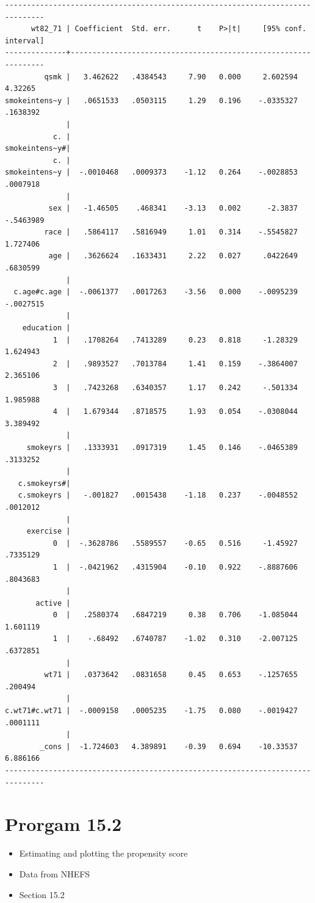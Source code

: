 \documentclass[
  10pt,
]{book}
\providecommand{\tightlist}{%
  \setlength{\itemsep}{0pt}\setlength{\parskip}{0pt}}
\begin{document}
\begin{verbatim}
-------------------------------------------------------------------------------
      wt82_71 | Coefficient  Std. err.      t    P>|t|     [95% conf. interval]
--------------+----------------------------------------------------------------
         qsmk |   3.462622   .4384543     7.90   0.000     2.602594     4.32265
smokeintens~y |   .0651533   .0503115     1.29   0.196    -.0335327    .1638392
              |
           c. |
smokeintens~y#|
           c. |
smokeintens~y |  -.0010468   .0009373    -1.12   0.264    -.0028853    .0007918
              |
          sex |   -1.46505    .468341    -3.13   0.002      -2.3837   -.5463989
         race |   .5864117   .5816949     1.01   0.314    -.5545827    1.727406
          age |   .3626624   .1633431     2.22   0.027     .0422649    .6830599
              |
  c.age#c.age |  -.0061377   .0017263    -3.56   0.000    -.0095239   -.0027515
              |
    education |
           1  |   .1708264   .7413289     0.23   0.818     -1.28329    1.624943
           2  |   .9893527   .7013784     1.41   0.159    -.3864007    2.365106
           3  |   .7423268   .6340357     1.17   0.242     -.501334    1.985988
           4  |   1.679344   .8718575     1.93   0.054    -.0308044    3.389492
              |
     smokeyrs |   .1333931   .0917319     1.45   0.146    -.0465389    .3133252
              |
   c.smokeyrs#|
   c.smokeyrs |   -.001827   .0015438    -1.18   0.237    -.0048552    .0012012
              |
     exercise |
           0  |  -.3628786   .5589557    -0.65   0.516     -1.45927    .7335129
           1  |  -.0421962   .4315904    -0.10   0.922    -.8887606    .8043683
              |
       active |
           0  |   .2580374   .6847219     0.38   0.706    -1.085044    1.601119
           1  |    -.68492   .6740787    -1.02   0.310    -2.007125    .6372851
              |
         wt71 |   .0373642   .0831658     0.45   0.653    -.1257655     .200494
              |
c.wt71#c.wt71 |  -.0009158   .0005235    -1.75   0.080    -.0019427    .0001111
              |
        _cons |  -1.724603   4.389891    -0.39   0.694    -10.33537    6.886166
-------------------------------------------------------------------------------
\end{verbatim}

\hypertarget{prorgam-15.2}{%
\section{Prorgam 15.2}\label{prorgam-15.2}}

\begin{itemize}
\tightlist
\item
  Estimating and plotting the propensity score
\item
  Data from NHEFS
\item
  Section 15.2
\end{itemize}
\end{document}
